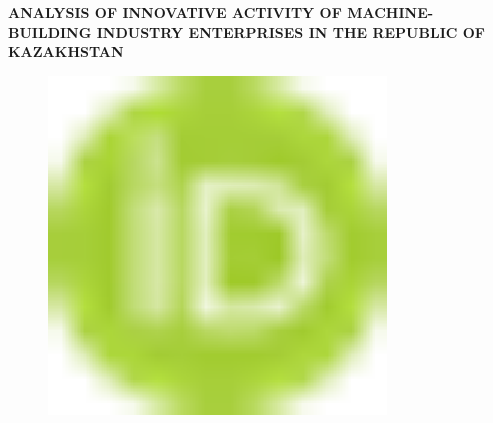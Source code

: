 
{\bfseries ANALYSIS OF INNOVATIVE ACTIVITY OF MACHINE-BUILDING INDUSTRY
ENTERPRISES IN THE REPUBLIC OF KAZAKHSTAN}

\begin{figure}[H]
	\centering
	\includegraphics[width=0.8\textwidth]{media/ekon2/image1}
	\caption*{}
\end{figure}


